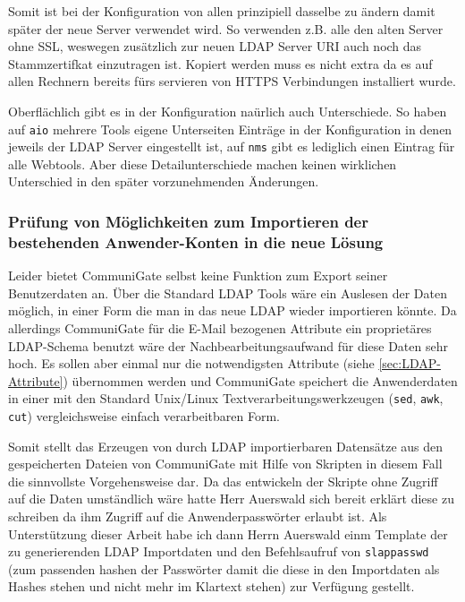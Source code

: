 \documentclass[11pt,a4paper,titlepage=firstiscover]{scrartcl} %
\begin{document}
Somit ist bei der Konfiguration von allen prinzipiell dasselbe zu \"andern damit sp\"ater der neue Server verwendet wird. So verwenden z.B. alle den alten Server ohne SSL, weswegen zus\"atzlich zur neuen LDAP Server URI auch noch das Stammzertifkat einzutragen ist. Kopiert werden muss es nicht extra da es auf allen Rechnern bereits f\"urs servieren von HTTPS Verbindungen installiert wurde. 

Oberfl\"achlich gibt es in der Konfiguration na\"urlich auch Unterschiede. So haben auf \texttt{aio} mehrere Tools eigene Unterseiten Eintr\"age in der Konfiguration in denen jeweils der LDAP Server eingestellt ist, auf \texttt{nms} gibt es lediglich einen Eintrag f\"ur alle Webtools. Aber diese Detailunterschiede machen keinen wirklichen Unterschied in den sp\"ater vorzunehmenden \"Anderungen.

\subsubsection{Pr\"ufung von M\"oglichkeiten zum Importieren der bestehenden Anwender-Konten in die neue L\"osung}
Leider bietet CommuniGate selbst keine Funktion zum Export seiner Benutzerdaten an. \"Uber die Standard LDAP Tools w\"are ein Auslesen der Daten m\"oglich, in einer Form die man in das neue LDAP wieder importieren k\"onnte. Da allerdings CommuniGate f\"ur die E-Mail bezogenen Attribute ein propriet\"ares LDAP-Schema benutzt w\"are der Nachbearbeitungsaufwand f\"ur diese Daten sehr hoch. Es sollen aber einmal nur die notwendigsten Attribute (siehe \autoref{sec:LDAP-Attribute}) \"ubernommen werden und CommuniGate speichert die Anwenderdaten in einer mit den Standard Unix/Linux Textverarbeitungswerkzeugen (\texttt{sed}, \texttt{awk}, \texttt{cut}) vergleichsweise einfach verarbeitbaren Form. 

Somit stellt das Erzeugen von durch LDAP importierbaren Datens\"atze aus den gespeicherten Dateien von CommuniGate mit Hilfe von Skripten in diesem Fall die sinnvollste Vorgehensweise dar. Da das entwickeln der Skripte ohne Zugriff auf die Daten umst\"andlich w\"are hatte Herr Auerswald sich bereit erkl\"art diese zu schreiben da ihm Zugriff auf die Anwenderpassw\"orter erlaubt ist. Als Unterst\"utzung dieser Arbeit habe ich dann Herrn Auerswald einm Template der zu generierenden LDAP Importdaten und den Befehlsaufruf von \texttt{slappasswd} (zum passenden hashen der Passw\"orter damit die diese in den Importdaten als Hashes stehen und nicht mehr im Klartext stehen) zur Verf\"ugung gestellt.
\end{document}
